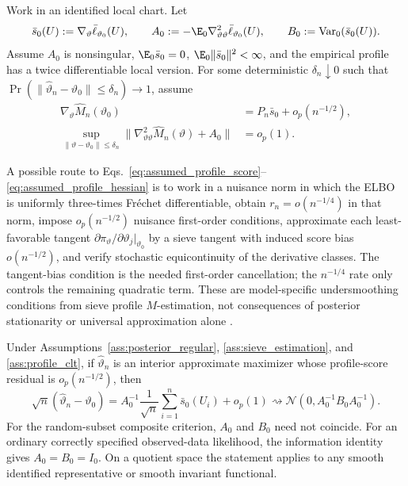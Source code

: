 \begin{assumption}
\label{ass:profile_clt}
Work in an identified local chart.  Let
\[
 \bar s_0(U):=\nabla_\vartheta\bar\ell_{\vartheta_0}(U),\qquad
 A_0:=-\E_0\nabla^2_{\vartheta\vartheta}
 \bar\ell_{\vartheta_0}(U),\qquad
 B_0:=\mathrm{Var}_0(\bar s_0(U)).
\]
Assume $A_0$ is nonsingular, $\E_0\bar s_0=0$,
$\E_0\|\bar s_0\|^2<\infty$, and the empirical profile has a twice
differentiable local version.  For some deterministic
$\delta_n\downarrow0$ such that
$\Pr(\|\widehat\vartheta_n-\vartheta_0\|\le\delta_n)\to1$, assume
\begin{align}
 \nabla_\vartheta\widehat M_n(\vartheta_0)
 &=P_n\bar s_0+o_p(n^{-1/2}),
 \label{eq:assumed_profile_score}\\
 \sup_{\|\vartheta-\vartheta_0\|\le\delta_n}
 \|\nabla^2_{\vartheta\vartheta}\widehat M_n(\vartheta)+A_0\|
 &=o_p(1).
 \label{eq:assumed_profile_hessian}
\end{align}
\end{assumption}

A possible route to
Eqs.~\eqref{eq:assumed_profile_score}--\eqref{eq:assumed_profile_hessian} is
to work in a nuisance norm in which the ELBO is uniformly three-times
Fr\'echet differentiable, obtain $r_n=o(n^{-1/4})$ in that norm, impose
$o_p(n^{-1/2})$ nuisance first-order conditions, approximate each
least-favorable tangent
$\partial\pi_\vartheta/\partial\vartheta_j|_{\vartheta_0}$ by a sieve tangent
with induced score bias $o(n^{-1/2})$, and verify stochastic equicontinuity of
the derivative classes.  The tangent-bias condition is the needed first-order
cancellation; the $n^{-1/4}$ rate only controls the remaining quadratic term.
These are model-specific undersmoothing conditions from sieve profile
$M$-estimation, not consequences of posterior stationarity or universal
approximation alone \citep{Chen2007Sieve,WestlingMcCormick2019}.

\begin{theorem}
\label{thm:sieve_clt}
Under Assumptions~\ref{ass:posterior_regular},
\ref{ass:sieve_estimation}, and \ref{ass:profile_clt}, if
$\widehat\vartheta_n$ is an interior approximate maximizer whose profile-score
residual is $o_p(n^{-1/2})$, then
\[
 \sqrt n(\widehat\vartheta_n-\vartheta_0)
 =A_0^{-1}\frac1{\sqrt n}\sum_{i=1}^n \bar s_0(U_i)+o_p(1)
 \rightsquigarrow
 \mathcal N(0,A_0^{-1}B_0A_0^{-1}).
\]
For the random-subset composite criterion, $A_0$ and $B_0$ need not coincide.
For an ordinary correctly specified observed-data likelihood, the information
identity gives $A_0=B_0=I_0$.  On a quotient space the statement applies to
any smooth identified representative or smooth invariant functional.
\end{theorem}

